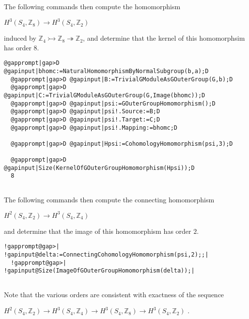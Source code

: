 \documentclass[a4paper,11pt]{report}
\begin{document}
{{ The following commands then compute the homomorphism 

$H^3(S_4,\mathbb Z_8) \rightarrow H^3(S_4,\mathbb Z_2)$ 

induced by $\mathbb Z_4 \rightarrowtail \mathbb Z_8 \twoheadrightarrow \mathbb Z_2$, and determine that the kernel of this homomorphsim has order $8$. 
\begin{Verbatim}[commandchars=@|D,fontsize=\small,frame=single,label=Example]
  @gapprompt|gap>D @gapinput|bhomc:=NaturalHomomorphismByNormalSubgroup(b,a);D
  @gapprompt|gap>D @gapinput|B:=TrivialGModuleAsGOuterGroup(G,b);D
  @gapprompt|gap>D @gapinput|C:=TrivialGModuleAsGOuterGroup(G,Image(bhomc));D
  @gapprompt|gap>D @gapinput|psi:=GOuterGroupHomomorphism();D
  @gapprompt|gap>D @gapinput|psi!.Source:=B;D
  @gapprompt|gap>D @gapinput|psi!.Target:=C;D
  @gapprompt|gap>D @gapinput|psi!.Mapping:=bhomc;D
  
  @gapprompt|gap>D @gapinput|Hpsi:=CohomologyHomomorphism(psi,3);D
  
  @gapprompt|gap>D @gapinput|Size(KernelOfGOuterGroupHomomorphism(Hpsi));D
  8
  
\end{Verbatim}
 

The following commands then compute the connecting homomorphism 

$H^2(S_4,\mathbb Z_2) \rightarrow H^3(S_4,\mathbb Z_4)$ 

and determine that the image of this homomorphism has order $2$. 
\begin{Verbatim}[commandchars=!@|,fontsize=\small,frame=single,label=Example]
  !gapprompt@gap>| !gapinput@delta:=ConnectingCohomologyHomomorphism(psi,2);;|
  !gapprompt@gap>| !gapinput@Size(ImageOfGOuterGroupHomomorphism(delta));|
  
\end{Verbatim}
 Note that the various orders are consistent with exactness of the sequence 

$H^2(S_4,\mathbb Z_2) \rightarrow H^3(S_4,\mathbb Z_4) \rightarrow
H^3(S_4,\mathbb Z_8) \rightarrow H^3(S_4,\mathbb Z_2) $ . }

 
}
\end{document}
